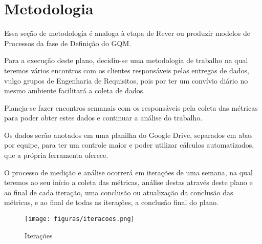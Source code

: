 \chapter{Metodologia}

Essa seção de metodologia é analoga à etapa de Rever ou produzir modelos de Processos da fase de Definição do GQM.


Para a execução deste plano, decidiu-se uma metodologia de trabalho na qual teremos vários encontros com os clientes responsáveis pelas entregas de dados, vulgo grupos de Engenharia de Requisitos, pois por ter um convívio diário no mesmo ambiente facilitará a coleta de dados.

Planeja-se fazer encontros semanais com os responsáveis pela coleta das métricas para poder obter estes dados e continuar a análise do trabalho. 

Os dados serão anotados em uma planilha do Google Drive, separados em abas por equipe, para ter um controle maior e poder utilizar cálculos automatizados, que a própria ferramenta oferece.
	
O processo de medição e análise ocorrerá em iterações de uma semana, na qual teremos ao seu início a coleta das métricas, análise destas através deste plano e ao final de cada iteração, uma conclusão ou atualização da conclusão das métricas, e ao final de todas as iterações, a conclusão final do plano.


\begin{figure}[H]
  \center
  \texttt{[image: figuras/iteracoes.png]}
  \caption{Iterações}
  \label{fig:iteracoes}
\end{figure}